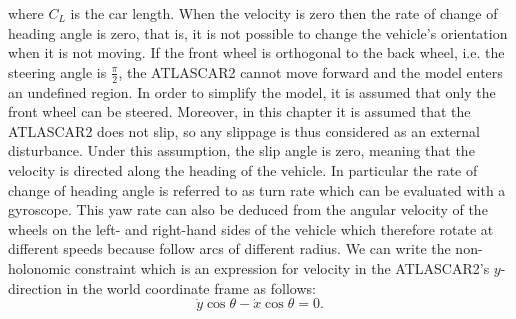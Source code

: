 where $C_L$ is the car length. When the velocity is zero then the rate of change of heading angle is zero, that is, it is not possible to change the vehicle's orientation
when it is not moving. If the front wheel is orthogonal to the back wheel, i.e. the steering angle is $\frac{\pi}{2}$, the ATLASCAR2 cannot move forward and the model enters an undefined region. In order to simplify the model, it is assumed that only the front wheel can be steered. Moreover, in this chapter it is assumed that the ATLASCAR2 does not slip, so any slippage is thus considered as an external disturbance. Under this assumption, the slip angle is zero, meaning that the velocity is directed along the heading of the vehicle. In particular the rate of change of heading angle is referred to as turn rate which can be evaluated with a gyroscope. This yaw rate can also be deduced from the angular velocity of the wheels on the left- and right-hand sides of the vehicle which therefore rotate at different speeds because follow arcs of different radius. We can write the non-holonomic constraint which is an expression for velocity in the ATLASCAR2's $y$-direction in the world coordinate frame as follows:
\begin{equation}
	\dot{y}\cos\theta-\dot{x}\cos\theta=0.
\end{equation}

